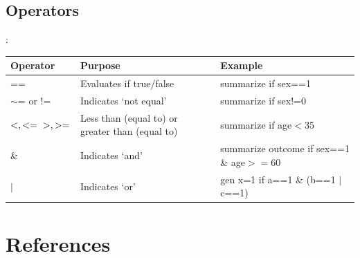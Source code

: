 \subsection{Operators}
\begin{frame}[fragile]{\secname : \subsecname}
\small
\renewcommand{\arraystretch}{1.25}
\begin{tabulary}{\textwidth}{LLL}
    \toprule
    \textbf{Operator} & \textbf{Purpose} & \textbf{Example} \\
    \midrule
    == & Evaluates if true/false & summarize if sex==1 \\
    $\sim$= or != & Indicates `not equal' & summarize if sex!=0 \\
    $< , <= \newline > , >=$ & Less than (equal to) or greater than (equal to) & summarize if age$<$35 \\
    \& & Indicates `and' & summarize outcome if sex==1 \& age$>=$60 \\
    $ \mid $ & Indicates `or' & gen x=1 if a==1 \& \newline (b==1 $\mid$ c==1) \\
\end{tabulary}
\end{frame}

\section{References}
\begin{frame}{\secname}
    \begin{scriptsize}
	
	
    \end{scriptsize}
\end{frame}

